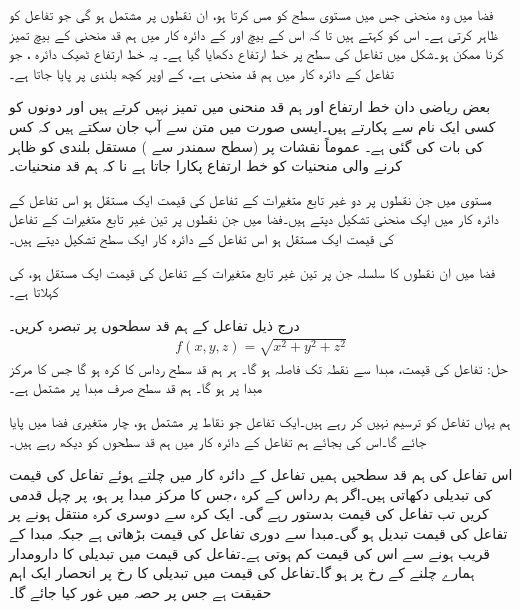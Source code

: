 فضا میں وہ منحنی جس میں  مستوی   سطح  کو مس کرتا   ہو،  ان نقطوں پر مشتمل ہو گی  جو تفاعل  کو ظاہر کرتی ہے۔ اس کو  کہتے ہیں تا کہ اس کے   بیچ  اور    کے دائرہ کار  میں  ہم قد منحنی کے بیچ  تمیز کرنا ممکن ہو۔شکل   میں تفاعل  کی سطح  پر  خط ارتفاع   دکھایا گیا ہے۔ یہ خط ارتفاع ٹھیک دائرہ  ، جو تفاعل کے دائرہ کار میں  ہم قد  منحنی  ہے، کے اوپر کچھ بلندی پر پایا جاتا ہے۔

 بعض ریاضی دان  خط ارتفاع اور  ہم قد  منحنی میں تمیز نہیں کرتے ہیں اور دونوں کو کسی ایک نام سے پکارتے ہیں۔ایسی صورت میں   متن سے آپ جان سکتے ہیں کہ کس کی بات کی گئی ہے۔ عموماً نقشات  پر  (سطح سمندر سے )   مستقل بلندی کو ظاہر کرنے والی منحنیات کو  خط ارتفاع  پکارا جاتا ہے نا کہ  ہم قد  منحنیات۔

مستوی میں جن نقطوں پر   دو غیر تابع  متغیرات کے  تفاعل  کی قیمت ایک مستقل  ہو اس تفاعل کے دائرہ کار میں ایک منحنی تشکیل دیتے ہیں۔فضا میں  جن نقطوں پر تین غیر تابع متغیرات کے تفاعل کی قیمت ایک مستقل   ہو  اس تفاعل کے دائرہ کار  ایک سطح تشکیل دیتے ہیں۔

فضا میں ان نقطوں    کا سلسلہ جن پر تین غیر تابع متغیرات کے تفاعل کی قیمت ایک مستقل  ہو،  کی  کہلاتا ہے۔

درج ذیل تفاعل کے ہم قد  سطحوں پر تبصرہ کریں۔
\begin{align*}
f(x,y,z)=\sqrt{x^2+y^2+z^2}
\end{align*}
حل:\quad
تفاعل  کی قیمت،   مبدا سے نقطہ  تک فاصلہ   ہو گا۔ ہر  ہم قد  سطح  رداس  کا کرہ ہو گا جس کا مرکز مبدا پر ہو گا۔   ہم قد  سطح   صرف مبدا پر مشتمل ہے۔

ہم یہاں تفاعل کو ترسیم نہیں کر رہے ہیں۔ایک تفاعل جو نقاط   پر مشتمل ہو،  چار متغیری فضا  میں پایا جائے گا۔اس کی بجائے  ہم تفاعل کے دائرہ کار میں  ہم قد  سطحوں کو دیکھ رہے ہیں۔

 اس تفاعل کی  ہم قد  سطحیں ہمیں   تفاعل کے دائرہ کار  میں  چلتے ہوئے تفاعل کی قیمت کی تبدیلی  دکھاتی ہیں۔اگر ہم رداس  کے کرہ ،جس کا مرکز مبدا پر ہو،   پر چہل قدمی  کریں  تب تفاعل کی قیمت بدستور  رہے گی۔ ایک کرہ سے دوسری کرہ  منتقل ہونے پر تفاعل کی قیمت تبدیل ہو گی۔مبدا سے دوری    تفاعل کی قیمت بڑھاتی ہے جبکہ مبدا کے قریب ہونے سے اس کی قیمت کم ہوتی ہے۔تفاعل کی قیمت میں تبدیلی کا دارومدار ہمارے چلنے کے رخ پر ہو گا۔تفاعل کی قیمت میں تبدیلی کا رخ پر انحصار ایک اہم حقیقت ہے جس پر حصہ  میں غور کیا جائے گا۔ 


